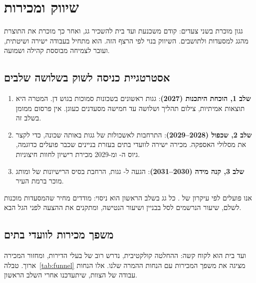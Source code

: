 \chapter{שיווק ומכירות}\label{ch:marketing}

גגון מוכרת בשני צעדים: קודם משכנעת ועד בית להשכיר גג, ואחר כך מוכרת את התוצרת מהגג למסעדות ולתושבים. השיווק בנוי לפי הרצף הזה. הוא מתחיל בעבודה ישירה ושיטתית, ועובר לצמיחה מבוססת קהילה ושמועה.

\section{אסטרטגיית כניסה לשוק בשלושה שלבים}\label{sec:gtm}

\begin{enumerate}
  \item \textbf{שלב 1, הוכחת היתכנות (2027)}: \RRroofsFirst{} גגות ראשונים בשכונות סמוכות בגוש דן. המטרה היא תוצאות אמיתיות, צילום תהליך ושלושה עד חמישה מסעדנים כעוגן. אין פרסום ממומן בשלב זה.
  \item \textbf{שלב 2, שכפול (2028--2029)}: התרחבות לאשכולות של גגות באותה שכונה, כדי לקצר את מסלולי האספקה. מכירה ישירה לוועדי בתים בעזרת בניינים שכבר פועלים כדוגמה, גיוס ה- ומ-2029 מכירת רישיון  לחוות חיצוניות.
  \item \textbf{שלב 3, קנה מידה (2030--2031)}: הגעה ל-\RRroofsFinal{} גגות, הרחבת בסיס הרישיונות של  ומותג מוכר ברמת העיר.
\end{enumerate}

אנו פועלים לפי עיקרון  של \cite{ries2011}. כל גג בשלב הראשון הוא ניסוי: מודדים מחיר שהמסעדות מוכנות לשלם, שיעור הנרשמים לסל בבניין ושיעור הנטישה, ומתקנים את ההצעה לפני הגל הבא.

\section{משפך מכירות לוועדי בתים}\label{sec:funnel}

ועד בית הוא לקוח קשה: ההחלטה קולקטיבית, נדרש רוב של בעלי הדירות, ומחזור המכירה ארוך. טבלה~\ref{tab:funnel} מציגה את משפך המכירות עם הנחות ההמרה שלנו. אלו הנחות עבודה של הצוות, שיתעדכנו אחרי השלב הראשון.

